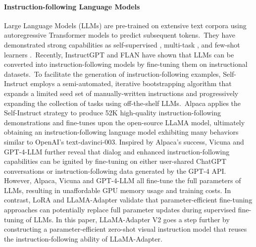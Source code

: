 \documentclass[10pt,twocolumn,letterpaper]{article}
\begin{document}
\paragraph{Instruction-following Language Models}
Large Language Models (LLMs) are pre-trained on extensive text corpora using autoregressive Transformer models to predict subsequent tokens.~They have demonstrated strong capabilities as self-supervised \cite{radford2018improving}, multi-task \cite{radford2019language}, and few-shot learners \cite{brown2020language}.~Recently, InstructGPT \cite{ouyang2022training} and FLAN \cite{wei2022finetuned,chung2022scaling} have shown that LLMs can be converted into instruction-following models by fine-tuning them on instructional datasets.~To facilitate the generation of instruction-following examples, Self-Instruct \cite{wang2022self} employs a semi-automated, iterative bootstrapping algorithm that expands a limited seed set of manually-written instructions and progressively expanding the collection of tasks using off-the-shelf LLMs.~Alpaca \cite{alpaca} applies the Self-Instruct strategy to produce 52K high-quality instruction-following demonstrations and fine-tunes upon the open-source LLaMA \cite{touvron2023llama} model, ultimately obtaining an instruction-following language model exhibiting many behaviors similar to OpenAI's text-davinci-003. Inspired by Alpaca's success, Vicuna \cite{vicuna2023} and GPT-4-LLM \cite{peng2023instruction} further reveal that dialog and enhanced instruction-following capabilities can be ignited by fine-tuning on either user-shared ChatGPT conversations or instruction-following data generated by the GPT-4 API. 
However, Alpaca, Vicuna and GPT-4-LLM all fine-tune the full parameters of LLMs, resulting in unaffordable GPU memory usage and training costs. In contrast, LoRA \cite{hu2022lora} and LLaMA-Adapter \cite{llamaadapter2023} validate that parameter-efficient fine-tuning approaches can potentially replace full parameter updates during supervised fine-tuning of LLMs. In this paper, LLaMA-Adapter V2 goes a step further by constructing a parameter-efficient zero-shot visual instruction model that reuses the instruction-following ability of LLaMA-Adapter.
\end{document}

